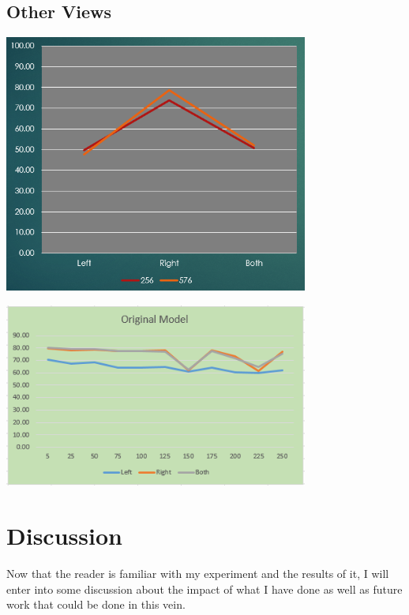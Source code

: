 \documentclass[]{report}
\begin{document}
\section{Other Views}

\begin{minipage}{\linewidth}
	\begin{minipage}{0.49\textwidth}
		\centering
		\includegraphics[width=0.75\textwidth]{../images/accuracy-deep}
	\end{minipage}
	\hfill
	\begin{minipage}{0.49\textwidth}
		\centering
		\includegraphics[width=0.75\textwidth]{../images/handed-original}
	\end{minipage}
\end{minipage}

\chapter{Discussion}

Now that the reader is familiar with my experiment and the results of it, I will enter into some discussion about the impact of what I have done as well as future work that could be done in this vein.
\end{document}
